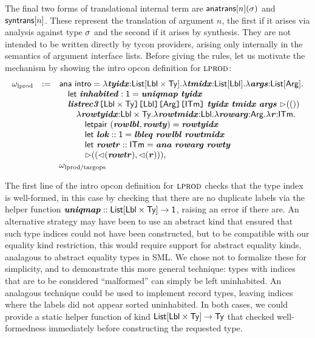 \documentclass{llncs}
\begin{document}
The final two forms of translational internal term are ${\sf anatrans}[n](\sigma)$ and ${\sf syntrans}[n]$. These represent the translation of argument $n$, the first if it arises via analysis against type $\sigma$ and the second if it arises by synthesis. They are not intended to be written directly by tycon providers, arising only internally in the semantics of argument interface lists. Before giving the rules, let us motivate the mechanism by showing the intro opcon definition for $\textsc{lprod}$:
\[
\begin{array}{lcl}
\omega_\text{lprod} & := & {\sf ana}~{\sf intro}=\lambda{\textbf{\textit{tyidx}}}{:}{\sf List}[{\sf Lbl}\times{\sf Ty}].\lambda{\textbf{\textit{tmidx}}}{:}{\sf List}[{\sf Lbl}].\lambda{\textbf{\textit{args}}}{:}{\sf List}[{\sf Arg}].\\
&&\quad {\sf let}~{\textbf{\textit{inhabited}}}:{\sf 1}={\textbf{\textit{uniqmap}}}~{\textbf{\textit{tyidx}}}\\
&&\quad {\textbf{\textit{listrec3}}}\texttt{[}{\sf Lbl}\times{\sf Ty}\texttt{]}\texttt{[}{\sf Lbl}\texttt{]}\texttt{[}{\sf Arg}\texttt{]}\texttt{[}{\sf ITm}\texttt{]}~{\textbf{\textit{tyidx}}}~{\textbf{\textit{tmidx}}}~{\textbf{\textit{args}}}~{\rhd}(())\\
&&\quad\quad \lambda {\textbf{\textit{rowtyidx}}}{:}{\sf Lbl}\times{\sf Ty}.\lambda {\textbf{\textit{rowtmidx}}}{:}{\sf Lbl}.\lambda{\textbf{\textit{rowarg}}}{:}{\sf Arg}.\lambda {\textbf{\textit{r}}}{:}{\sf ITm}.\\
&&\quad\quad\quad {\sf letpair}~({\textbf{\textit{rowlbl}}}, {\textbf{\textit{rowty}}})={\textbf{\textit{rowtyidx}}}\\
&&\quad\quad\quad {\sf let}~{\textbf{\textit{lok}}}::{\sf 1}={\textbf{\textit{lbleq}}}~{\textbf{\textit{rowlbl}}} ~{\textbf{\textit{rowtmidx}}}\\
&&\quad\quad\quad {\sf let}~{\textbf{\textit{rowtr}}} :: {\sf ITm} = {\textbf{\textit{ana}}}~{\textbf{\textit{rowarg}}}~{\textbf{\textit{rowty}}}\\
&&\quad\quad\quad {\rhd}(({\lhd}({\textbf{\textit{rowtr}}}), {\lhd}({\textbf{\textit{r}}}))
),\\
&&\omega_\text{lprod/targops}
\end{array}
\]


The first line of the intro opcon definition for $\textsc{lprod}$ checks that the type index is well-formed, in this case by checking that there are no duplicate labels via the helper function ${\textbf{\textit{uniqmap}}} :: {\sf List}[{\sf Lbl} \times {\sf Ty}]\rightarrow {\sf 1}$, raising an error if there are. An alternative strategy may have been to use an abstract kind that ensured that such type indices could not have been constructed, but to be compatible with our equality kind restriction, this would require support for abstract equality kinds, analagous to abstract equality types in SML. We chose not to formalize these for simplicity, and to demonstrate this more general technique: types with indices that are to be considered ``malformed'' can simply be left uninhabited. An analagous technique could be used to implement record types, leaving indices where the labels did not appear sorted uninhabited. In both cases, we could provide a static helper function of kind ${\sf List}[{\sf Lbl}\times{\sf Ty}]\rightarrow {\sf Ty}$ that checked well-formedness immediately before constructing the requested type.
\end{document}
